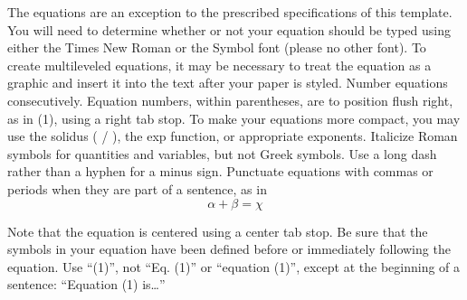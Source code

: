 \documentclass[letterpaper, 12 pt, conference]{ieeeconf}  %
\begin{document}
The equations are an exception to the prescribed specifications of this template. You will need to determine whether or not your equation should be typed using either the Times New Roman or the Symbol font (please no other font). To create multileveled equations, it may be necessary to treat the equation as a graphic and insert it into the text after your paper is styled. Number equations consecutively. Equation numbers, within parentheses, are to position flush right, as in (1), using a right tab stop. To make your equations more compact, you may use the solidus ( / ), the exp function, or appropriate exponents. Italicize Roman symbols for quantities and variables, but not Greek symbols. Use a long dash rather than a hyphen for a minus sign. Punctuate equations with commas or periods when they are part of a sentence, as in
\begin{equation}
\alpha + \beta = \chi
\end{equation}

Note that the equation is centered using a center tab stop. Be sure that the symbols in your equation have been defined before or immediately following the equation. Use ``(1)'', not ``Eq. (1)'' or ``equation (1)'', except at the beginning of a sentence: ``Equation (1) is\ldots''
\end{document}
